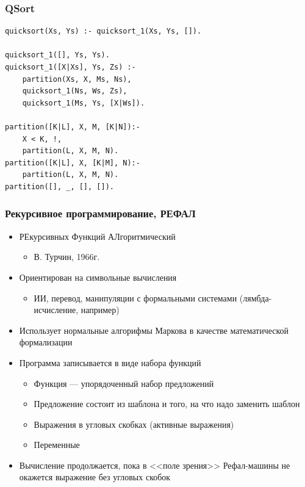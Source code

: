 \documentclass{../../slides-style}
\begin{document}
    \begin{frame}[fragile]
        \frametitle{QSort}
        \begin{verbatim}
quicksort(Xs, Ys) :- quicksort_1(Xs, Ys, []).

quicksort_1([], Ys, Ys).
quicksort_1([X|Xs], Ys, Zs) :-
    partition(Xs, X, Ms, Ns),
    quicksort_1(Ns, Ws, Zs),
    quicksort_1(Ms, Ys, [X|Ws]).
 
partition([K|L], X, M, [K|N]):-
    X < K, !,
    partition(L, X, M, N).
partition([K|L], X, [K|M], N):-
    partition(L, X, M, N).
partition([], _, [], []).
        \end{verbatim}
    \end{frame}

    \begin{frame}
        \frametitle{Рекурсивное программирование, РЕФАЛ}
        \begin{itemize}
            \item РЕкурсивных Функций АЛгоритмический
            \begin{itemize}
                \item В. Турчин, 1966г.
            \end{itemize}
            \item Ориентирован на символьные вычисления
            \begin{itemize}
                \item ИИ, перевод, манипуляции с формальными системами (лямбда-исчисление, например)
            \end{itemize}
            \item Использует нормальные алгорифмы Маркова в качестве математической формализации
            \item Программа записывается в виде набора функций
            \begin{itemize}
                \item Функция --- упорядоченный набор предложений
                \item Предложение состоит из шаблона и того, на что надо заменить шаблон
                \item Выражения в угловых скобках (активные выражения)
                \item Переменные
            \end{itemize}
            \item Вычисление продолжается, пока в <<поле зрения>> Рефал-машины не окажется выражение без угловых скобок
        \end{itemize}
    \end{frame}
\end{document}
